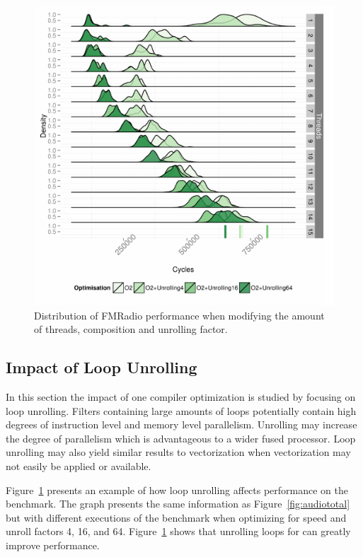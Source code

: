 \begin{figure}
  \includegraphics[width=1\textwidth]{streamit-paper/graphics/unrolled_fm.pdf}
  \caption{Distribution of FMRadio performance when modifying the amount of threads, composition and unrolling factor.}\label{fig:fmunroll}
\end{figure}

\subsection{Impact of Loop Unrolling}
In this section the impact of one compiler optimization is studied by focusing on loop unrolling.
Filters containing large amounts of loops potentially contain high degrees of instruction level and memory level parallelism.
Unrolling may increase the degree of parallelism which is advantageous to a wider fused processor.
Loop unrolling may also yield similar results to vectorization when vectorization may not easily be applied or available.

Figure~\ref{fig:fmunroll} presents an example of how loop unrolling affects performance on the  benchmark.
The graph presents the same information as Figure~\ref{fig:audiototal} but with different executions of the benchmark when optimizing for speed and unroll factors 4, 16, and 64.
Figure~\ref{fig:fmunroll} shows that unrolling loops for  can greatly improve performance.

